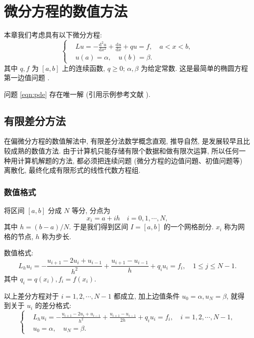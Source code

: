 \documentclass[master,print]{shnuthesis}
\begin{document}

\chapter{微分方程的数值方法}

本章我们考虑具有以下微分方程:
\begin{equation}\label{eqn:pde}
\left\{\begin{aligned}
& L u=-\frac{\mathrm{d}^{2} u}{\mathrm{d} x^{2}}+\frac{\mathrm{d} u}{\mathrm{d} x}+q u=f, \quad a < x < b, \\
& u(a)=\alpha, \quad u(b)=\beta.
\end{aligned}\right.
\end{equation}
其中 $q, f$ 为 $[a,b]$ 上的连续函数, $q \geqslant 0$; $\alpha, \beta$ 为给定常数. 这是最简单的椭圆方程第一边值问题 .

问题 \eqref{eqn:pde} 存在唯一解 (引用示例参考文献 \cite{LiLiu1997}).


\section{有限差分方法}
在偏微分方程的数值解法中, 有限差分法数学概念直观, 推导自然, 是发展较早且比较成熟的数值方法. 由于计算机只能存储有限个数据和做有限次运算, 所以任何一种用计算机解题的方法, 都必须把连续问题 (微分方程的边值问題、初值问题等) 离散化, 最终化成有限形式的线性代数方程组.

\subsection{数值格式}
将区间 $[a,b]$ 分成 $N$ 等分, 分点为
\begin{equation*}
  x_{i}=a+i h \quad i=0,1, \cdots, N,
\end{equation*}
其中 $h=(b-a) / N$. 于是我们得到区间 $I=[a,b]$ 的一个网格剖分. $x_i$ 称为网格的节点, $h$ 称为步长.

数值格式:
\begin{equation*}
  L_{h} u_{i}=-\frac{u_{i+1}-2 u_{i}+u_{i-1}}{h^{2}}+\frac{u_{i+1}-u_{i-1}}{h}+q_{i} u_{i}=f_{i},\quad 1 \leqslant j \leqslant N-1.
\end{equation*}
其中  $q_{i}=q(x_{i}), f_{i}=f(x_{i})$.

以上差分方程对于 $i=1,2, \cdots, N-1$ 都成立, 加上边值条件 $u_{0}=\alpha, u_{N}=\beta$, 就得到关于 $u_i$ 的差分格式:
\begin{equation}\label{eqn:fdm}
\left\{\begin{aligned}
& L_{h} u_{i}=-\frac{u_{i+1}-2 u_{i}+u_{i-1}}{h^{2}}+\frac{u_{i+1}-u_{i-1}}{2h}+q_{i} u_{i}=f_{i}, \quad i=1,2, \cdots, N-1, \\
& u_{0}=\alpha, \quad u_{N}=\beta.
\end{aligned}\right.
\end{equation}
\end{document}
